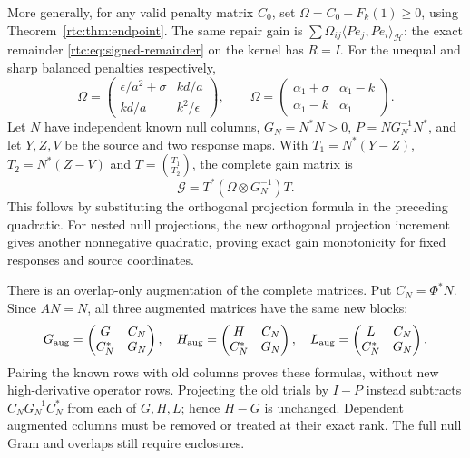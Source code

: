 \documentclass[11pt,a4paper]{article}
\numberwithin{equation}{section}
\theoremstyle{definition}\newtheorem{definition}[theorem]{Definition}
\theoremstyle{remark}\newtheorem{remark}[theorem]{Remark}
\newcommand{\Hh}{\mathcal H}\newcommand{\Hw}{\mathcal H}
\newcommand{\ip}[2]{\langle#1,#2\rangle}\newcommand{\norm}[1]{\lVert#1\rVert}\newcommand{\abs}[1]{\lvert#1\rvert}
\begin{document}
More generally, for any valid penalty matrix $C_0$, set
$\Omega=C_0+F_k(1)\ge0$, using Theorem~\ref{rtc:thm:endpoint}.
The same repair gain is
$\sum\Omega_{ij}\ip{Pe_j}{Pe_i}_{\Hh}$: the exact remainder
\eqref{rtc:eq:signed-remainder} on the kernel has $R=I$.
For the unequal and sharp balanced penalties respectively,
\[
 \Omega=\begin{pmatrix}\epsilon/a^2+\sigma&kd/a\\kd/a&k^2/\epsilon\end{pmatrix},
 \qquad
 \Omega=\begin{pmatrix}\alpha_1+\sigma&\alpha_1-k\\
                         \alpha_1-k&\alpha_1\end{pmatrix}.
\]
Let $N$ have independent known null columns, $G_N=N^*N>0$,
$P=NG_N^{-1}N^*$, and let $Y,Z,V$ be the source and two response maps.
With $T_1=N^*(Y-Z)$, $T_2=N^*(Z-V)$ and $T=\binom{T_1}{T_2}$, the
complete gain matrix is
\begin{equation}\label{rtc:eq:null-matrix}
 \mathcal G=T^*(\Omega\otimes G_N^{-1})T.
\end{equation}
This follows by substituting the orthogonal projection formula in the
preceding quadratic. For nested null projections, the new orthogonal
projection increment gives another nonnegative quadratic, proving exact
gain monotonicity for fixed responses and source coordinates.

There is an overlap-only augmentation of the complete matrices. Put
$C_N=\Phi^*N$. Since $AN=N$, all three augmented matrices have the same
new blocks:
\begin{equation}\label{rtc:eq:null-augmentation}
 G_{\rm aug}=\begin{pmatrix}G&C_N\\C_N^*&G_N\end{pmatrix},\quad
 H_{\rm aug}=\begin{pmatrix}H&C_N\\C_N^*&G_N\end{pmatrix},\quad
 L_{\rm aug}=\begin{pmatrix}L&C_N\\C_N^*&G_N\end{pmatrix}.
\end{equation}
Pairing the known rows with old columns proves these formulas, without
new high-derivative operator rows. Projecting the old trials by $I-P$
instead subtracts $C_NG_N^{-1}C_N^*$ from each of $G,H,L$; hence $H-G$
is unchanged. Dependent augmented columns must be removed or treated at
their exact rank. The full null Gram and overlaps still require enclosures.
\end{document}
